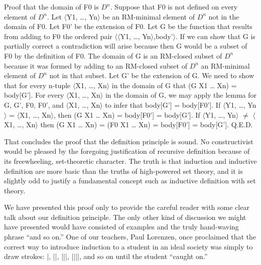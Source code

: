 \documentclass[11pt]{book}
\begin{document}
Proof that the domain of F0 is $D^{n}$.  Suppose that F0 is not defined on
every element of $D^{n}$.  Let $\langle$Y1, \ldots{}, Yn$\rangle$ be an RM-minimal
element of $D^{n}$ not in the domain of F0.  Let F0' be the
extension of F0.  Let G be the function that results from adding to
F0 the ordered pair $\langle \langle$Y1, \ldots{}, Yn$\rangle$,body'$\rangle$.  If we can show that
G is partially correct a contradiction will arise because then G would
be a subset
of F0 by the definition of F0.  The domain of G is an RM-closed subset of $D^{n}$
because it was formed by adding to an RM-closed subset of $D^{n}$
an RM-minimal element of $D^{n}$ not in that subset.
Let G' be the extension of G.
We need to show that for every n-tuple $\langle$X1, \ldots{}, Xn$\rangle$ in the domain of G that (G X1 \ldots{} Xn)
= body[G'].  For every $\langle$X1, \ldots{}, Xn$\rangle$ in the domain of G, we may apply the
lemma for G, G', F0, F0', and $\langle$X1, \ldots{}, Xn$\rangle$ to infer that body[G'] =
body[F0'].  If $\langle$Y1, \ldots{}, Yn$\rangle$ = $\langle$X1, \ldots{}, Xn$\rangle$, then (G X1 \ldots{} Xn) =
body[F0'] = body[G'].  If $\langle$Y1, \ldots{}, Yn$\rangle$ $\neq$ $\langle$X1, \ldots{}, Xn$\rangle$ then
(G X1 \ldots{} Xn) = (F0 X1 \ldots{} Xn) = body[F0'] = body[G'].
Q.E.D.

That concludes the proof that the definition
principle is sound.  No constructivist would
be pleased by the foregoing justification of recursive
definition because of its freewheeling, set-theoretic
character.  The truth is that induction and inductive
definition are more basic than the truths of
high-powered set theory, and it is slightly odd
to justify a fundamental concept such
as inductive definition with set theory.

We have presented this proof only to provide
the careful reader with some clear talk about our
definition principle.  The only other kind
of discussion we might have presented would
have consisted of examples and the truly
hand-waving phrase ``and so on.''  One of our
teachers,  Paul Lorenzen, once proclaimed
that the correct way to introduce induction
to a student in an ideal society
was simply to draw strokes: |, ||, |||, ||||, 
and so on until the student ``caught on.''
\end{document}
